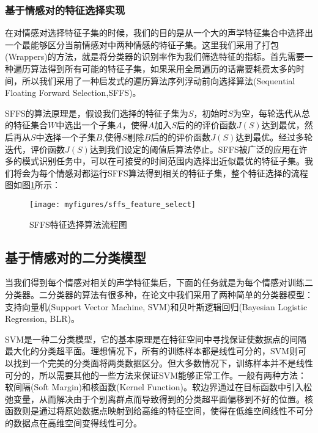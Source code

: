 \subsubsection{基于情感对的特征选择实现}
\label{sssec:emo_pair_feature_select_implement}
在对情感对选择特征子集的时候，我们的目的是从一个大的声学特征集合中选择出一个最能够区分当前情感对中两种情感的特征子集。这里我们采用了打包(Wrappers)的方法，就是将分类器的识别率作为我们筛选特征的指标。首先需要一种遍历算法得到所有可能的特征子集，如果采用全局遍历的话需要耗费太多的时间，所以我们采用了一种启发式的遍历算法序列浮动前向选择算法(Sequential Floating Forward Selection,SFFS)。

SFFS的算法原理是，假设我们选择的特征子集为$S$，初始时$S$为空，每轮迭代从总的特征集合$W$中选出一个子集$A$，使得$A$加入$S$后的的评价函数$J(S)$达到最优，然后再从$S$中选择一个子集$B$,使得$S$剔除$B$后的的评价函数$J(S)$达到最优。经过多轮迭代，评价函数$J(S)$达到我们设定的阈值后算法停止。SFFS被广泛的应用在许多的模式识别任务中，可以在可接受的时间范围内选择出近似最优的特征子集。我们将会为每个情感对都运行SFFS算法得到相关的特征子集，整个特征选择的流程图如图\ref{fig:sffs_feature_select}所示：

\begin{figure}[H] %
    \centering
    \texttt{[image: myfigures/sffs\_feature\_select]}
    \caption{SFFS特征选择算法流程图}
    \label{fig:sffs_feature_select}
\end{figure}

\subsection{基于情感对的二分类模型}
\label{ssec:emo_pair_bi_cls}

当我们得到每个情感对相关的声学特征集后，下面的任务就是为每个情感对训练二分类器。二分类器的算法有很多种，在论文中我们采用了两种简单的分类器模型：支持向量机(Support Vector Machine, SVM)和贝叶斯逻辑回归(Bayesian Logistic Regression, BLR)。

SVM是一种二分类模型，它的基本原理是在特征空间中寻找保证使数据点的间隔最大化的分类超平面。理想情况下，所有的训练样本都是线性可分的，SVM则可以找到一个完美的分类面将两类数据区分。但大多数情况下，训练样本并不是线性可分的，所以需要其他的一些方法来保证SVM能够正常工作。一般有两种方法：软间隔(Soft Margin)和核函数(Kernel Function)。软边界通过在目标函数中引入松弛变量，从而解决由于个别离群点而导致得到的分类超平面偏移到不好的位置。核函数则是通过将原始数据点映射到给高维的特征空间，使得在低维空间线性不可分的数据点在高维空间变得线性可分。

